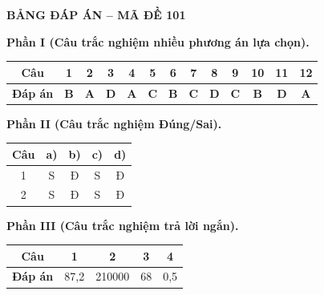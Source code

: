 \vspace{0.4cm}
\noindent\begin{minipage}{\linewidth}
\begin{center}{\large\bfseries\color{red!80!black} BẢNG ĐÁP ÁN -- MÃ ĐỀ 101}\end{center}
\vspace{0.15cm}
\noindent\textbf{Phần I (Câu trắc nghiệm nhiều phương án lựa chọn).}\par\smallskip
\begin{center}
\begin{tabular}{|c|c|c|c|c|c|c|c|c|c|c|c|c|}\hline
\textbf{Câu} & 1 & 2 & 3 & 4 & 5 & 6 & 7 & 8 & 9 & 10 & 11 & 12 \\ \hline
\textbf{Đáp án} & \textbf{B} & \textbf{A} & \textbf{D} & \textbf{A} & \textbf{C} & \textbf{B} & \textbf{C} & \textbf{D} & \textbf{C} & \textbf{B} & \textbf{D} & \textbf{A} \\ \hline
\end{tabular}
\end{center}
\noindent\textbf{Phần II (Câu trắc nghiệm Đúng/Sai).}\par\smallskip
\begin{center}
\begin{tabular}{|c|c|c|c|c|}\hline
\textbf{Câu} & \textbf{a)} & \textbf{b)} & \textbf{c)} & \textbf{d)} \\ \hline
1 & S & Đ & S & Đ \\ \hline
2 & S & Đ & S & Đ \\ \hline
\end{tabular}
\end{center}
\noindent\textbf{Phần III (Câu trắc nghiệm trả lời ngắn).}\par\smallskip
\begin{center}
\begin{tabular}{|c|c|c|c|c|}\hline
\textbf{Câu} & 1 & 2 & 3 & 4 \\ \hline
\textbf{Đáp án} & 87,2 & 210000 & 68 & 0,5 \\ \hline
\end{tabular}
\end{center}
\end{minipage}
